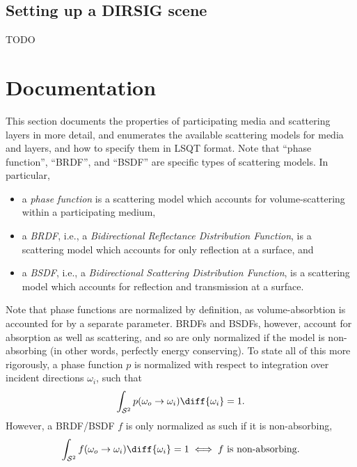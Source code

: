 \documentclass[
    twoside,
    twocolumn,
    letterpaper,
    10pt]{article}
\begin{document}
\subsection{Setting up a DIRSIG scene}
\label{sec:tutorial6}

TODO

\section{Documentation}
\label{sec:doc}

This section documents the properties of participating media and 
scattering layers in more detail, and enumerates the available 
scattering models for media and layers, and how to specify them in 
LSQT format. Note that ``phase function'', ``BRDF'', and ``BSDF'' are
specific types of scattering models. In particular,
\begin{itemize}
    \item a \emph{phase function} is a scattering model which accounts
        for volume-scattering within a participating medium,
    \item a \emph{BRDF}, i.e., a \emph{Bidirectional Reflectance Distribution 
        Function}, is a scattering model which accounts for only reflection at 
        a surface, and
    \item a \emph{BSDF}, i.e., a \emph{Bidirectional Scattering Distribution 
        Function}, is a scattering model which accounts for reflection and 
        transmission at a surface.
\end{itemize}

Note that phase functions are normalized by 
definition, as volume-absorbtion is accounted for by a separate parameter. 
BRDFs and BSDFs, however, account for absorption as well as scattering, 
and so are only normalized if the model is non-absorbing (in other words,
perfectly energy conserving). To state all of this more rigorously, a
phase function $p$ is normalized with respect to integration over 
incident directions $\omega_i$, such that
\begin{equation*}
    \int_{\mathcal{S}^2} p(\omega_o\to\omega_i) \diff{\omega_i} = 1.
\end{equation*}
However, a BRDF/BSDF $f$ is only normalized as such if it is 
non-absorbing,
\begin{equation*}
    \int_{\mathcal{S}^2} f(\omega_o\to\omega_i) \diff{\omega_i} = 1
    \iff \text{$f$ is non-absorbing.}
\end{equation*}
\end{document}
